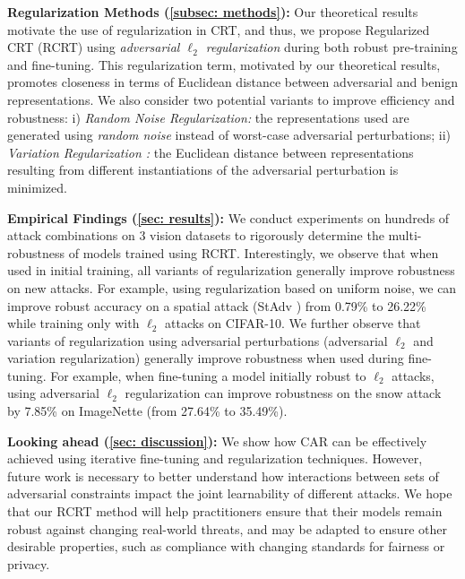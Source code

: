 \textbf{Regularization Methods (\cref{subsec: methods}):} Our theoretical results motivate the use of regularization in CRT, and thus, we propose Regularized CRT (RCRT) using \emph{adversarial $\ell_2$ regularization} during both robust pre-training and fine-tuning. This regularization term, motivated by our theoretical results, promotes closeness in terms of Euclidean distance between adversarial and benign representations. We also consider two potential variants to improve efficiency and robustness: i) \emph{Random Noise Regularization:} the representations used are generated using \emph{random noise} instead of worst-case adversarial perturbations; ii) \emph{Variation Regularization \citep{dai2022formulating}:} the Euclidean distance between representations resulting from different instantiations of the adversarial perturbation is minimized.

\noindent \textbf{Empirical Findings (\cref{sec: results}):} We conduct experiments on hundreds of attack combinations on 3 vision datasets to rigorously determine the multi-robustness of models trained using RCRT.  Interestingly, we observe that when used in initial training, all variants of regularization generally improve robustness on new attacks.  For example, using regularization based on uniform noise, we can improve robust accuracy on a spatial attack (StAdv \citep{XiaoZ0HLS18}) from 0.79\% to 26.22\% while training only with $\ell_2$ attacks on CIFAR-10.  We further observe that variants of regularization using adversarial perturbations (adversarial $\ell_2$ and variation regularization) generally improve robustness when used during fine-tuning.  For example, when fine-tuning a model initially robust to $\ell_2$ attacks, using adversarial $\ell_2$ regularization can improve robustness on the snow attack~\citep{kaufmann2019testing} by 7.85\% on ImageNette \citep{imagenette} (from 27.64\% to 35.49\%).%

\noindent \textbf{Looking ahead (\cref{sec: discussion}):} We show how CAR can be effectively achieved using iterative fine-tuning and regularization techniques. However, future work is necessary to better understand how interactions between sets of adversarial constraints impact the joint learnability of different attacks. We hope that our RCRT method will help practitioners ensure that their models remain robust against changing real-world threats, and may be adapted to ensure other desirable properties, such as compliance with changing standards for fairness or privacy. 


